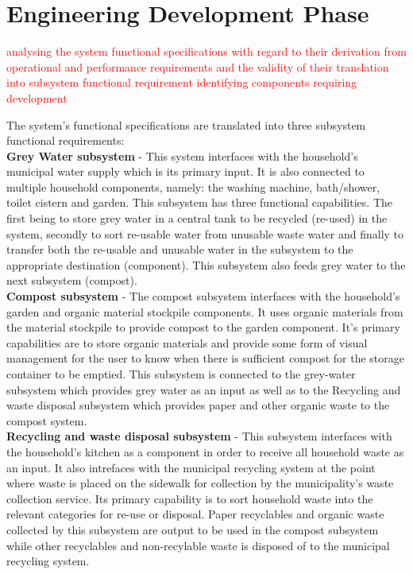 \documentclass[a4paper,11pt,fleqn]{report}
\begin{document}
\chapter{Engineering Development Phase}
\textcolor{red}{analysing the system functional specifications with regard to their derivation from operational and performance requirements and the validity of their translation into subsystem functional requirement identifying components requiring development}

The system's functional specifications are translated into three subsystem functional requirements:\\

\textbf{Grey Water subsystem} - This system interfaces with the household's municipal water supply which is its primary input. It is also connected to multiple household components, namely: the washing machine, bath/shower, toilet cistern and garden. This subsystem has three functional capabilities. The first being to store grey water in a central tank to be recycled (re-used) in the system, secondly to sort re-usable water from unusable waste water and finally to transfer both the re-usable and unusable water in the subsystem to the appropriate destination (component). This subsystem also feeds grey water to the next subsystem (compost).\\

\textbf{Compost subsystem} -  The compost subsystem interfaces with the household's garden and organic material stockpile components. It uses organic materials from the material stockpile to provide compost to the garden component. It's primary capabilities are to store organic materials and provide some form of visual management for the user to know when there is sufficient compost for the storage container to be emptied. This subsystem is connected to the grey-water subsystem which provides grey water as an input as well as to the Recycling and waste disposal subsystem which provides paper and other organic waste to the compost system.\\

\textbf{Recycling and waste disposal subsystem} - This subsystem interfaces with the household's kitchen as a component in order to receive all household waste as an input. It also intrefaces with the municipal recycling system at the point where waste is placed on the sidewalk for collection by the municipality's waste collection service. Its primary capability is to sort household waste into the relevant categories for re-use or disposal. Paper recyclables and organic waste collected by this subsystem are output to be used in the compost subsystem while other recyclables and non-recylable waste is disposed of to the municipal recycling system.
\end{document}
